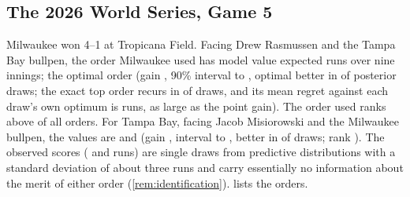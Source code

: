 \subsection{The 2026 World Series, Game 5}\label{sec:res-ref}

Milwaukee won 4--1 at Tropicana Field. Facing Drew Rasmussen and the Tampa Bay bullpen, the order
Milwaukee used has model value \RefActualAway{} expected runs over nine innings; the optimal order
\RefOptimalAway{} (gain \RefUpliftAway{}, 90\% interval \RefLoAway{} to \RefHiAway{}, optimal
better in \RefPBetterAway{} of \RefDraws{} posterior draws; the exact top order recurs in
\RefSameAway{} of draws, and its mean regret against each draw's own optimum is \RefRegretAway{}
runs, as large as the point gain). The order used ranks above
\RefPctAway{} of all orders. For Tampa Bay, facing Jacob Misiorowski and the Milwaukee bullpen, the
values are \RefActualHome{} and \RefOptimalHome{} (gain \RefUpliftHome{}, interval \RefLoHome{} to
\RefHiHome{}, better in \RefPBetterHome{} of draws; rank \RefPctHome{}). The observed scores
(\RefObservedAway{} and \RefObservedHome{} runs) are single draws from predictive distributions
with a standard deviation of about three runs and carry essentially no information about the
merit of either order (\cref{rem:identification}).  lists the orders.


